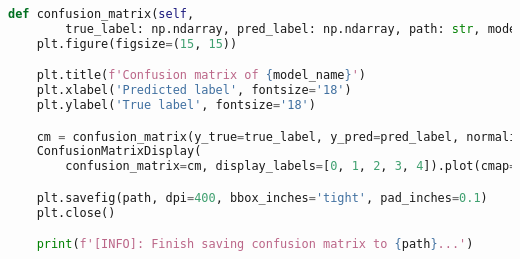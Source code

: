 \begin{lstlisting}[language=Python, caption={Python code of \textcolor{blue}{\textbf{Confusion matrix}} (some code is omitted).}, label={confusion-matrix}]
def confusion_matrix(self, 
        true_label: np.ndarray, pred_label: np.ndarray, path: str, model_name: str) -> None:
    plt.figure(figsize=(15, 15))

    plt.title(f'Confusion matrix of {model_name}')
    plt.xlabel('Predicted label', fontsize='18')
    plt.ylabel('True label', fontsize='18') 

    cm = confusion_matrix(y_true=true_label, y_pred=pred_label, normalize='true')
    ConfusionMatrixDisplay(
        confusion_matrix=cm, display_labels=[0, 1, 2, 3, 4]).plot(cmap=plt.cm.Blues)

    plt.savefig(path, dpi=400, bbox_inches='tight', pad_inches=0.1) 
    plt.close()

    print(f'[INFO]: Finish saving confusion matrix to {path}...')\end{lstlisting}
